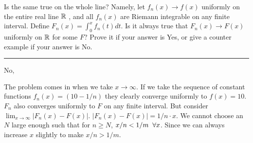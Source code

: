 \documentclass[11pt]{article}
\begin{document}

Is the same true on the whole line? Namely, let $f_n(x) \to f(x)$ uniformly on the entire real line $\reals$
, and all $f_n(x)$ are Riemann integrable on any finite interval. Define $F_n(x) = \int_0 ^x f_n(t) dt$.
Is it always true that $F_n(x) \to F(x)$ uniformly on $\reals$ for some $F$?
Prove it if your answer is Yes, or give a counter example if your answer is No.

\hrule

No,

The problem comes in when we take $x \to \infty$.
If we take the sequence of constant functions $f_n (x) = (10 - 1/n)$ they clearly converge uniformly to $f(x) = 10$.
$F_n$ also converges uniformly to $F$ on any finite interval. But consider $\lim_{x \to \infty} |F_n(x) - F(x)|$.
$|F_n(x) - F(x)| = 1/n \cdot x$. We cannot choose an $N$ large enough such that for $n \geq N$, $x/n < 1/m \sp \forall x$.
Since we can always increase $x$ slightly to make $x/n > 1/m$.
\end{document}
